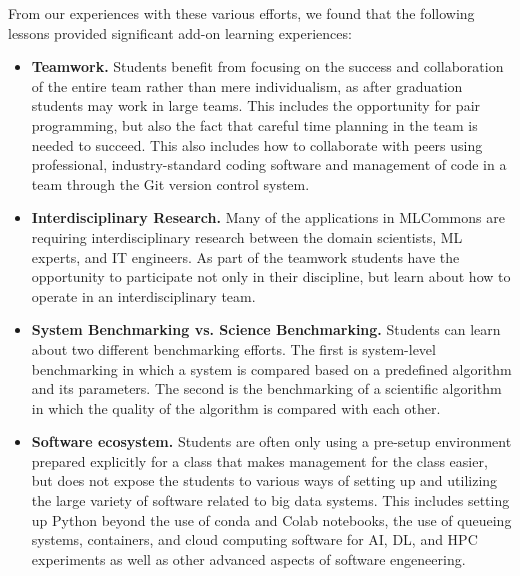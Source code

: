 \documentclass[utf8]{FrontiersinVancouver} %
\begin{document}
From our experiences with these various efforts, we found that the
following lessons provided significant add-on learning experiences:


\begin{itemize}


  \item {\bf Teamwork.} Students benefit from focusing on the success
    and collaboration of the entire team rather than mere
    individualism, as after graduation students may work in large
    teams. This includes the opportunity for pair programming, but also
    the fact that careful time planning in the team is needed to
    succeed.  This also includes how to collaborate with peers using
    professional, industry-standard coding software and management of
    code in a team through the Git version control system.

  \item {\bf Interdisciplinary Research.} Many of the applications in
    MLCommons are requiring interdisciplinary research between the domain
    scientists, ML experts, and IT engineers. As part of the teamwork
    students have the opportunity to participate not only in their
    discipline, but learn about how to operate in an interdisciplinary
    team.

  \item {\bf System Benchmarking vs. Science Benchmarking.} Students
    can learn about two different benchmarking efforts. The first is
    system-level benchmarking in which a system is compared based
    on a predefined algorithm and its parameters. The second is the
    benchmarking of a scientific algorithm in which the quality of the
    algorithm is compared with each other.

  \item {\bf Software ecosystem.} Students are often only using a
    pre-setup environment prepared explicitly for a class that makes
    management for the class easier, but does not expose the students
    to various ways of setting up and utilizing the large variety of
    software related to big data systems. This includes setting up
    Python beyond the use of conda and Colab notebooks, the use of
    queueing systems, containers, and cloud computing software for
    AI, DL, and HPC experiments as well as other advanced aspects of
    software engeneering.


\end{itemize}
\end{document}
